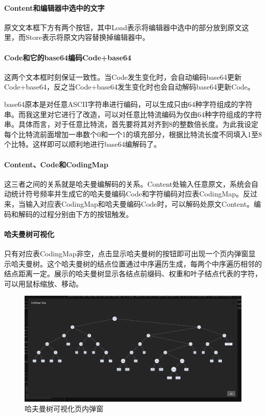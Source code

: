 \documentclass[scheme = chinese]{ctexart}
\begin{document}
\paragraph{Content和编辑器中选中的文字}
原文文本框下方有两个按钮，其中Load表示将编辑器中选中的部分放到原文这里，而Store表示将原文内容替换掉编辑器中。

\paragraph{Code和它的base64编码Code+base64}
这两个文本框时刻保证一致性。当Code发生变化时，会自动编码base64更新Code+base64，反之当Code+base64发生变化时也会自动解码base64更新Code。

base64原本是对任意ASCII字符串进行编码，可以生成只由64种字符组成的字符串。而我这里对它进行了改造，可以对任意比特流编码为仅由64种字符组成的字符串。具体而言，对于任意比特流，首先要将其对齐到8的整数倍长度。为此我设定每个比特流前面增加一串数个0和一个1的填充部分，根据比特流长度不同填入1至8个比特。这样即可以顺利地进行base64编解码了。

\paragraph{Content、Code和CodingMap}
这三者之间的关系就是哈夫曼编解码的关系。Content处输入任意原文，系统会自动统计符号频率并生成它的哈夫曼编码Code和字符编码对应表CodingMap。反过来，当输入对应表CodingMap和哈夫曼编码Code时，可以解码处原文Content。编码和解码的过程分别由下方的按钮触发。

\paragraph{哈夫曼树可视化}
只有对应表CodingMap非空，点击显示哈夫曼树的按钮即可出现一个页内弹窗显示哈夫曼树。这个哈夫曼树的结点位置通过中序遍历生成，每两个中序遍历相邻的结点距离一定。展示的哈夫曼树显示各结点前缀码、权重和叶子结点代表的字符，可以用鼠标缩放、移动。

\begin{figure}[h]
    \centering
    \includegraphics[width=\textwidth]{images/HuffmanTree-all.png}
    \caption{哈夫曼树可视化页内弹窗}
\end{figure}
\clearpage
\end{document}
